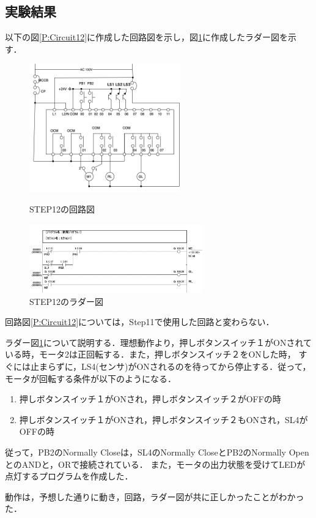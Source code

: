 \documentclass[a4paper,11pt]{jsarticle}
\begin{document}
\subsection{実験結果}
以下の図\ref{P:Circuit12}に作成した回路図を示し，図\ref{C:Step12}に作成したラダー図を示す．
\begin{figure}[H]
  \begin{minipage}{0.38\textwidth}
    \begin{center}
      \includegraphics[clip,width=6.5cm]{picture/Circuit11.png}
    \end{center}
    \caption{STEP12の回路図}
    \label{P:Circuit12}
  \end{minipage}
  \begin{minipage}{0.58\textwidth}
    \begin{center}
      \includegraphics[clip,width=7.5cm]{picture/Step12.pdf}
    \end{center}
    \caption{STEP12のラダー図}
    \label{C:Step12}
  \end{minipage}
\end{figure}
回路図\ref{P:Circuit12}については，Step11で使用した回路と変わらない．\par
ラダー図\ref{C:Step12}について説明する．理想動作より，押しボタンスイッチ１がONされている時，モータ2は正回転する．また，押しボタンスイッチ２をONした時，
すぐには止まらずに，LS4(センサ)がONされるのを待ってから停止する．従って，モータが回転する条件が以下のようになる．
\begin{enumerate}
  \item 押しボタンスイッチ１がONされ，押しボタンスイッチ２がOFFの時 \\
  \item 押しボタンスイッチ１がONされ，押しボタンスイッチ２もONされ，SL4がOFFの時
\end{enumerate}
従って，PB2のNormally Closeは，SL4のNormally CloseとPB2のNormally OpenとのANDと，ORで接続されている．
また，モータの出力状態を受けてLEDが点灯するプログラムを作成した．\par
動作は，予想した通りに動き，回路，ラダー図が共に正しかったことがわかった．
\end{document}
